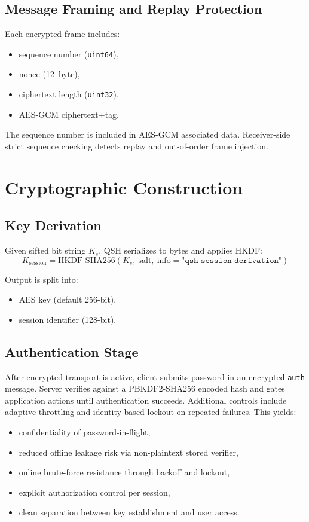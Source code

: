 \documentclass[11pt,a4paper]{article}
\begin{document}
\subsection{Message Framing and Replay Protection}
Each encrypted frame includes:
\begin{itemize}[leftmargin=1.5em]
  \item sequence number (\texttt{uint64}),
  \item nonce (\SI{12}{byte}),
  \item ciphertext length (\texttt{uint32}),
  \item AES-GCM ciphertext+tag.
\end{itemize}

The sequence number is included in AES-GCM associated data. Receiver-side strict sequence checking detects replay and out-of-order frame injection.

\section{Cryptographic Construction}
\subsection{Key Derivation}
Given sifted bit string $K_s$, QSH serializes to bytes and applies HKDF:
\[
K_{\text{session}} = \text{HKDF-SHA256}(K_s,\ \text{salt},\ \text{info}=\texttt{"qsh-session-derivation"})
\]

Output is split into:
\begin{itemize}[leftmargin=1.5em]
  \item AES key (default 256-bit),
  \item session identifier (128-bit).
\end{itemize}

\subsection{Authentication Stage}
After encrypted transport is active, client submits password in an encrypted \texttt{auth} message. Server verifies against a PBKDF2-SHA256 encoded hash and gates application actions until authentication succeeds. Additional controls include adaptive throttling and identity-based lockout on repeated failures. This yields:
\begin{itemize}[leftmargin=1.5em]
  \item confidentiality of password-in-flight,
  \item reduced offline leakage risk via non-plaintext stored verifier,
  \item online brute-force resistance through backoff and lockout,
  \item explicit authorization control per session,
  \item clean separation between key establishment and user access.
\end{itemize}
\end{document}

